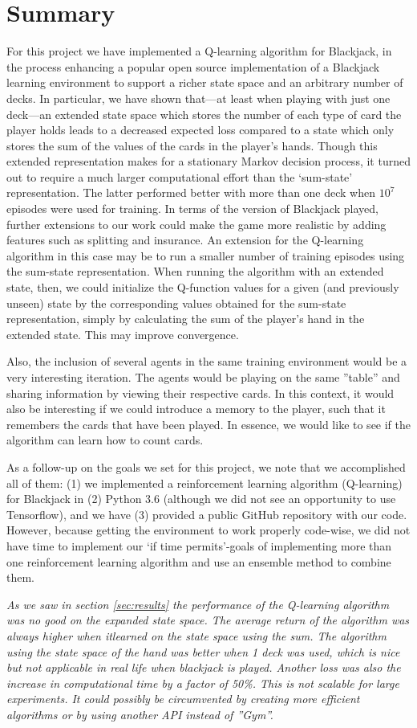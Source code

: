 \section{Summary} \label{sec:summary}
For this project we have implemented a Q-learning algorithm for Blackjack, in the process
enhancing a popular open source implementation of a Blackjack learning environment to
support a richer state space and an arbitrary number of decks. In particular, we have shown 
that---at least when playing with just one deck---an extended state space which stores the 
number of each type of card the player holds leads to a decreased expected loss compared to a 
state which only stores the sum of the values of the cards in the player's hands. Though this
extended representation makes for a stationary Markov decision process, it turned out to require
a much larger computational effort than the `sum-state' representation. The latter performed
better with more than one deck when $10^7$ episodes were used for training.
In terms of the version of Blackjack played,
further extensions to our work could make the game more realistic by adding features such
as splitting and insurance. An extension for the Q-learning algorithm in this case may be
to run a smaller number of training episodes using the sum-state representation.
When running the algorithm with an extended state, then, we could initialize the Q-function
values for a given (and previously unseen) state by the corresponding values obtained for
the sum-state representation, simply by calculating the sum of the player's hand in the
extended state. This may improve convergence.

Also, the inclusion of several agents in the same training environment would be a very interesting iteration.
The agents would be playing on the same ''table'' and sharing information by viewing their respective cards. In
this context, it would also be interesting if we could introduce a memory to the player, such that it remembers
the cards that have been played. In essence, we would like to see if the algorithm can learn how to count cards. 

As a follow-up on the goals we set for this project, we note that we accomplished all of
them: (1) we implemented a reinforcement learning algorithm (Q-learning) for Blackjack
in (2) Python 3.6 (although we did not see an opportunity to use Tensorflow), and
we have (3) provided a public GitHub repository with our code. However, because getting the 
environment to work properly code-wise, we did not have time to implement our `if time permits'-goals
of implementing more than one reinforcement learning algorithm and use an ensemble method to
combine them.

\textit{
As we saw in section \ref{sec:results} the performance of the Q-learning algorithm was no good on the expanded state space. The average return of the algorithm was always higher when itlearned on the state space using the sum. The algorithm using the state space of the hand was better when 1 deck was used, which is nice but not applicable in real life when blackjack  is played.
Another loss was also the increase in computational time by a factor of 50\%. This is not scalable for large experiments. It could possibly be circumvented by creating more efficient 
algorithms or by using another API instead of ''Gym''.
}
